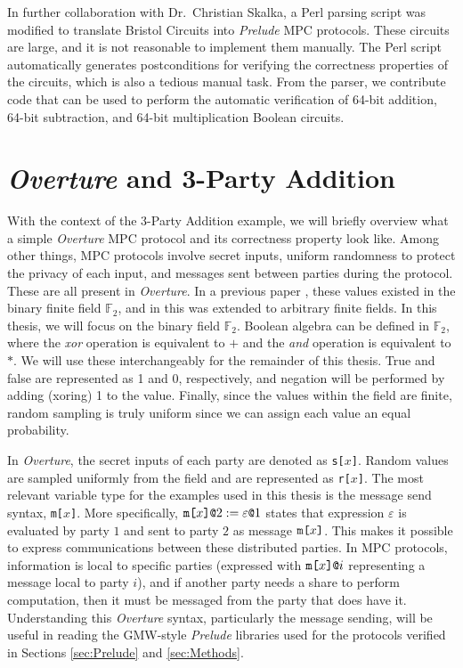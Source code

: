 \documentclass{article}
\begin{document}
In further collaboration with Dr.\ Christian Skalka, a Perl parsing script was modified to translate Bristol Circuits into \textit{Prelude} MPC protocols. These circuits are large, and it is not reasonable to implement them manually. The Perl script automatically generates postconditions for verifying the correctness properties of the circuits, which is also a tedious manual task. From the parser, we contribute code that can be used to perform the automatic verification of 64-bit addition, 64-bit subtraction, and 64-bit multiplication Boolean circuits. 
\section{\textit{Overture} and 3-Party Addition}
With the context of the 3-Party Addition example, we will briefly overview what a simple \textit{Overture} MPC protocol and its correctness property look like. Among other things, MPC protocols involve secret inputs, uniform randomness to protect the privacy of each input, and messages sent between parties during the protocol. These are all present in \textit{Overture}. In a previous paper \cite{skalka-near-ppdp24}, these values existed in the binary finite field $\mathbb{F}_2$, and in \cite{skalka-near-esop25} this was extended to arbitrary finite fields. In this thesis, we will focus on the binary field $\mathbb{F}_2$. Boolean algebra can be defined in $\mathbb{F}_2$, where the \textit{xor} operation is equivalent to $+$ and the \textit{and} operation is equivalent to $*$. We will use these interchangeably for the remainder of this thesis. True and false are represented as 1 and 0, respectively, and negation will be performed by adding (xoring) 1 to the value. Finally, since the values within the field are finite, random sampling is truly uniform since we can assign each value an equal probability. 

In \textit{Overture}, the secret inputs of each party are denoted as \texttt{s[$x$]}. Random values are sampled uniformly from the field and are represented as \texttt{r[$x$]}. The most relevant variable type for the examples used in this thesis is the message send syntax, \texttt{m[$x$]}. More specifically, $\texttt{m[}x\texttt{]}\texttt{@}2 := \varepsilon\texttt{@}1$
states that expression $\varepsilon$ is evaluated by party $1$ and sent to party $2$ as message $\texttt{m[}x\texttt{]}$. This makes it possible to express communications between these distributed parties. In MPC protocols, information is local to specific parties (expressed with $\texttt{m[}x\texttt{]}\texttt{@}i$ representing a message local to party $i$), and if another party needs a share to perform computation, then it must be messaged from the party that does have it. Understanding this \textit{Overture} syntax, particularly the message sending, will be useful in reading the GMW-style \textit{Prelude} libraries used for the protocols verified in Sections \ref{sec:Prelude} and \ref{sec:Methods}. 
\end{document}

